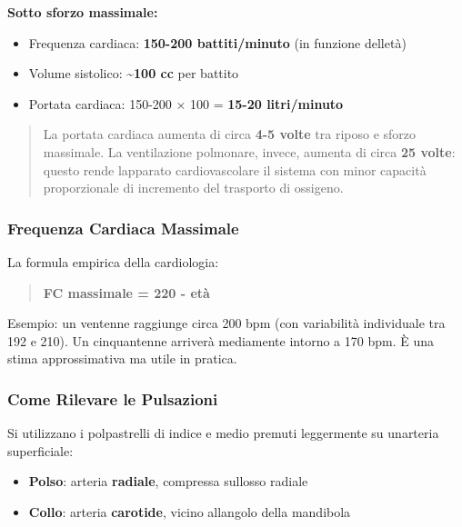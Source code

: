 \documentclass[a4paper,11pt]{article}
\providecommand{\tightlist}{%
  \setlength{\itemsep}{0pt}\setlength{\parskip}{0pt}}
\begin{document}
\textbf{Sotto sforzo massimale:}

\begin{itemize}
      \tightlist
      \item
            Frequenza cardiaca: \textbf{150-200 battiti/minuto} (in funzione
            dell\textquotesingle età)
      \item
            Volume sistolico: \textasciitilde{}\textbf{100 cc} per battito
      \item
            Portata cardiaca: 150-200 × 100 = \textbf{15-20 litri/minuto}
\end{itemize}

\begin{quote}
      La portata cardiaca aumenta di circa \textbf{4-5 volte} tra riposo e
      sforzo massimale. La ventilazione polmonare, invece, aumenta di circa
      \textbf{25 volte}: questo rende l\textquotesingle apparato
      cardiovascolare il sistema con minor capacità proporzionale di
      incremento del trasporto di ossigeno.
\end{quote}

\subsubsection{Frequenza Cardiaca
      Massimale}\label{frequenza-cardiaca-massimale}

La formula empirica della cardiologia:

\begin{quote}
      \textbf{FC massimale = 220 - età}
\end{quote}

Esempio: un ventenne raggiunge circa 200 bpm (con variabilità
individuale tra 192 e 210). Un cinquantenne arriverà mediamente intorno
a 170 bpm. È una stima approssimativa ma utile in pratica.

\subsubsection{Come Rilevare le
      Pulsazioni}\label{come-rilevare-le-pulsazioni}

Si utilizzano i polpastrelli di indice e medio premuti leggermente su
un\textquotesingle arteria superficiale:

\begin{itemize}
      \tightlist
      \item
            \textbf{Polso}: arteria \textbf{radiale}, compressa
            sull\textquotesingle osso radiale
      \item
            \textbf{Collo}: arteria \textbf{carotide}, vicino
            all\textquotesingle angolo della mandibola
\end{itemize}
\end{document}
